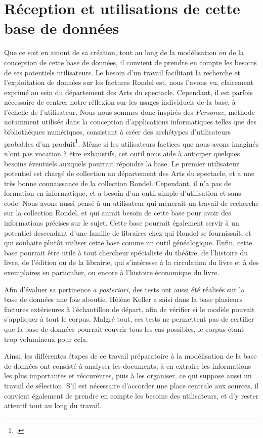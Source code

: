 \section{Réception et utilisations de cette base de données}

Que ce soit en amont de sa création, tout au long de la modélisation ou de la conception de cette base de données, il convient de prendre en compte les besoins de ses potentiels utilisateurs. Le besoin d'un travail facilitant la recherche et l'exploitation de données sur les factures Rondel est, nous l'avons vu, clairement exprimé au sein du département des Arts du spectacle. 
Cependant, il est parfois nécessaire de centrer notre réflexion sur les usages individuels de la base, à l'échelle de l'utilisateur. 
Nous nous sommes donc inspirés des \textit{Personae}, méthode notamment utilisée dans la conception d'applications informatiques telles que des bibliothèques numériques, consistant à créer des archétypes d'utilisateurs probables d'un produit\footcite{Brangier_2012}. Même si les utilisateurs factices que nous avons imaginés n'ont pas vocation à être exhaustifs, cet outil nous aide à anticiper quelques besoins éventuels auxquels pourrait répondre la base. Le premier utilisateur potentiel est chargé de collection au département des Arts du spectacle, et a une très bonne connaissance de la collection Rondel. Cependant, il n'a pas de formation en informatique, et a besoin d'un outil simple d'utilisation et sans code. Nous avons aussi pensé à un utilisateur qui mènerait un travail de recherche sur la collection Rondel, et qui aurait besoin de cette base pour avoir des informations précises sur le sujet. Cette base pourrait également servir à un potentiel descendant d'une famille de libraires chez qui Rondel se fournissait, et qui souhaite plutôt utiliser cette base comme un outil généalogique. Enfin, cette base pourrait être utile à tout chercheur spécialiste du théâtre, de l'histoire du livre, de l'édition ou de la librairie, qui s'intéresse à la circulation du livre et à des exemplaires en particulier, ou encore à l'histoire économique du livre. 

Afin d'évaluer sa pertinence \emph{a posteriori}, des tests ont aussi été réalisés sur la base de données une fois aboutie. Hélène Keller a saisi dans la base plusieurs factures extérieures à l'échantillon de départ, afin de vérifier si le modèle pouvait s'appliquer à tout le corpus. Malgré tout, ces tests ne permettent pas de certifier que la base de données pourrait couvrir tous les cas possibles, le corpus étant trop volumineux pour cela. 


Ainsi, les différentes étapes de ce travail préparatoire à la modélisation de la base de données ont consisté à analyser les documents, à en extraire les informations les plus importantes et réccurentes, puis à les organiser, ce qui suppose aussi un travail de sélection. S'il est nécessaire d'accorder une place centrale aux sources, il convient également de prendre en compte les besoins des utilisateurs, et d'y rester attentif tout au long du travail. 

